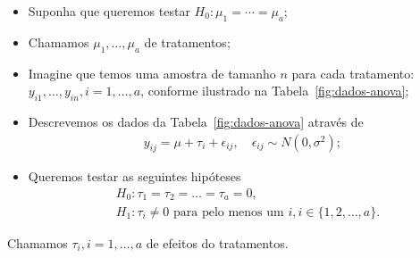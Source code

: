 \documentclass[8pt]{beamer}
\begin{document}
\begin{frame}{}

\footnotesize
	\begin{itemize}
		\item Suponha que queremos testar $H_0: \mu_1 = \cdots = \mu_a$;
		\item Chamamos $\mu_1, \dots, \mu_a$ de tratamentos;
		\item Imagine que temos uma amostra de tamanho $n$ para cada tratamento: $y_{i1}, \dots, y_{in}, i=1, \dots, a$, conforme ilustrado na Tabela~\ref{fig:dados-anova};
		\begin{table}[htbp]
			\centering
			\caption{Dados de um estudo completamento aleatórios e balanceados com um fator.}
			\label{fig:dados-anova}
		\end{table}
	
		\item  Descrevemos os dados da Tabela~\ref{fig:dados-anova} através de
		\begin{align} \label{eq:anova}
			y_{ij} = \mu + \tau_i + \epsilon_{ij}, \quad \epsilon_{ij} \sim N(0, \sigma^2);
		\end{align}

		\item Queremos testar as seguintes hipóteses
		\begin{align*} 
	 		&H_0: \tau_1 = \tau_2 = \dots = \tau_a = 0,\\
			&H_1: \tau_i \neq 0 \mbox{ para pelo menos um }i, i\in \{1, 2, \dots, a\}. 
		\end{align*}
	\end{itemize}
	Chamamos $\tau_i, i=1, \dots, a$ de efeitos do tratamentos.
\end{frame}
\end{document}

